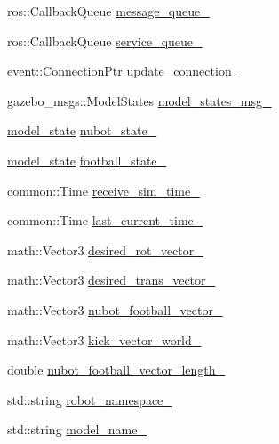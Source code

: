 \begin{DoxyCompactItemize}
\item 
ros\-::\-Callback\-Queue \hyperlink{classgazebo_1_1NubotGazebo_a7186c914f81602db7bd347b940794bbf}{message\-\_\-queue\-\_\-}
\item 
ros\-::\-Callback\-Queue \hyperlink{classgazebo_1_1NubotGazebo_ae1fe2dc1962659f70ebba9555a92e59a}{service\-\_\-queue\-\_\-}
\item 
event\-::\-Connection\-Ptr \hyperlink{classgazebo_1_1NubotGazebo_a4e3b8b74aa075427ecbd5c82f630144d}{update\-\_\-connection\-\_\-}
\item 
gazebo\-\_\-msgs\-::\-Model\-States \hyperlink{classgazebo_1_1NubotGazebo_a320dc212fab523958abb529f946133bd}{model\-\_\-states\-\_\-msg\-\_\-}
\item 
\hyperlink{structgazebo_1_1model__state}{model\-\_\-state} \hyperlink{classgazebo_1_1NubotGazebo_a5abf5be34d8441db05d94ead7924ce14}{nubot\-\_\-state\-\_\-}
\item 
\hyperlink{structgazebo_1_1model__state}{model\-\_\-state} \hyperlink{classgazebo_1_1NubotGazebo_af7356a83d30997d884440a10e95d29f4}{football\-\_\-state\-\_\-}
\item 
common\-::\-Time \hyperlink{classgazebo_1_1NubotGazebo_a36186a24f60f3c88fd6fb12fd85b4fa4}{receive\-\_\-sim\-\_\-time\-\_\-}
\item 
common\-::\-Time \hyperlink{classgazebo_1_1NubotGazebo_a8e05ad53365765db200e0d62c451e069}{last\-\_\-current\-\_\-time\-\_\-}
\item 
math\-::\-Vector3 \hyperlink{classgazebo_1_1NubotGazebo_a385577ffa9cc48440e8047019d6e67f6}{desired\-\_\-rot\-\_\-vector\-\_\-}
\item 
math\-::\-Vector3 \hyperlink{classgazebo_1_1NubotGazebo_ac515996ccf0c682a0ed88f00e401373d}{desired\-\_\-trans\-\_\-vector\-\_\-}
\item 
math\-::\-Vector3 \hyperlink{classgazebo_1_1NubotGazebo_ae4b4790d24996fbfdd51f74baa45170a}{nubot\-\_\-football\-\_\-vector\-\_\-}
\item 
math\-::\-Vector3 \hyperlink{classgazebo_1_1NubotGazebo_aea8b62919e2834d4311a7fd7935036af}{kick\-\_\-vector\-\_\-world\-\_\-}
\item 
double \hyperlink{classgazebo_1_1NubotGazebo_a11fbfac7f239d13730b4d676af18f67e}{nubot\-\_\-football\-\_\-vector\-\_\-length\-\_\-}
\item 
std\-::string \hyperlink{classgazebo_1_1NubotGazebo_ac92e4461911d9522f1454978d26ec461}{robot\-\_\-namespace\-\_\-}
\item 
std\-::string \hyperlink{classgazebo_1_1NubotGazebo_adf2314dfb2ab6cb5ecdb2bb0a9736665}{model\-\_\-name\-\_\-}

\end{DoxyCompactItemize}
